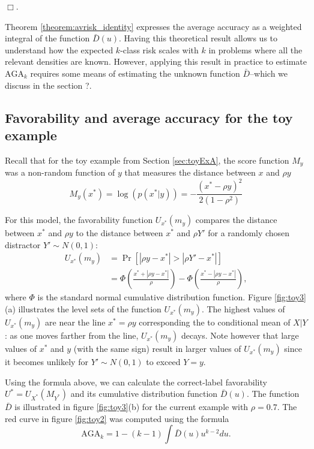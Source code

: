 \documentclass[twoside,11pt]{article}
\begin{document}
$\Box$.


Theorem \ref{theorem:avrisk_identity} expresses the average accuracy as a weighted integral of the function $\bar{D}(u)$.
Having this theoretical result allows us to understand how the
expected $k$-class risk scales with $k$ in problems where all the
relevant densities are known.  However, applying this result in
practice to estimate $\text{AGA}_k$ requires some means of
estimating the unknown function $\bar{D}$--which we discuss in the
section ?.

\subsection{Favorability and average accuracy for the toy example}

Recall that for the toy example from Section \ref{sec:toyExA}, 
the score function $M_{y}$ was a non-random function of $y$ that measures the distance between $x$ and $\rho y$ 
\[
M_{y}(x^*) = \log(p(x^*|y)) = -\frac{(x^* - \rho y)^2}{2(1-\rho^2)} 
\]

For this model, the favorability function $U_{x^*}(m_y)$ compares the distance between $x^*$ and $\rho y$ to the distance between $x^*$ and $\rho Y'$ for a randomly chosen distractor $ Y'\sim N(0,1)$:
\begin{align*}
U_{x^*}(m_y) &= \Pr[|\rho y - x^*|> |\rho Y' - x^*|] 
\\&= \Phi\left(\frac{x^* + |\rho y - x^*|}{\rho}\right) - \Phi\left(\frac{x^* - |\rho y - x^*|}{\rho}\right),
\end{align*}
where $\Phi$ is the standard normal cumulative distribution function.
Figure \ref{fig:toy3}(a) illustrates the level sets of the function
$U_{x^*}(m_y)$.  The highest values of $U_{x^*}(m_y)$ are near the line $x^* = \rho
y$ corresponding the to conditional mean of $X|Y$: as one moves
farther from the line, $U_{x^*}(m_y)$ decays.  Note however that large
values of $x^*$ and $y$ (with the same sign) result in larger values of
$U_{x^*}(m_y)$ since it becomes unlikely for $Y' \sim N(0,1)$ to exceed
$Y = y$.

Using the formula above, we can calculate the correct-label favorability $U^* = U_{X^*}(M_{Y^*})$ and its cumulative distribution function $\bar{D}(u)$.
The function $\bar{D}$ is illustrated in
figure \ref{fig:toy3}(b) for the current example with $\rho = 0.7$.
The red curve in figure \ref{fig:toy2} was computed using the formula
\[
\text{AGA}_k = 1-(k-1) \int \bar{D}(u) u^{k-2} du.
\]
\end{document}
